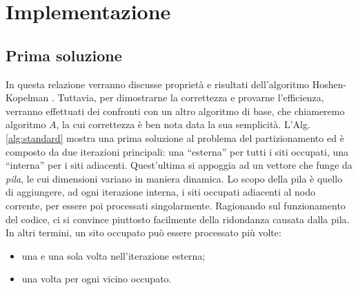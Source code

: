 \section{Implementazione}
\label{sec:implementazione}

\subsection*{Prima soluzione}

In questa relazione verranno discusse proprietà e risultati 
dell'algoritmo Hoshen-Kopelman \cite{Hoshen-Kopelman}.
Tuttavia, per dimostrarne la correttezza e provarne l'efficienza,
verranno effettuati dei confronti con un altro algoritmo di base,
che chiameremo algoritmo $A$,
la cui correttezza è ben nota data la sua semplicità.
L'Alg. \ref{alg:standard} mostra una prima soluzione 
al problema del partizionamento ed è composto da due iterazioni principali: 
una ``esterna'' per tutti i siti occupati, una ``interna'' per i siti 
adiacenti. Quest'ultima si appoggia ad un vettore che 
funge da \textit{pila}, le cui dimensioni variano in maniera dinamica.
Lo scopo della pila è quello di aggiungere, ad ogni iterazione interna, 
i siti occupati adiacenti al nodo corrente, per essere poi processati
singolarmente.
Ragionando sul funzionamento del codice, ci si convince piuttosto 
facilmente della ridondanza causata dalla pila. In altri termini,
un sito occupato può essere processato più volte:
\begin{itemize}
    \item una e una sola volta nell'iterazione esterna;
    \item una volta per ogni vicino occupato.
\end{itemize}

